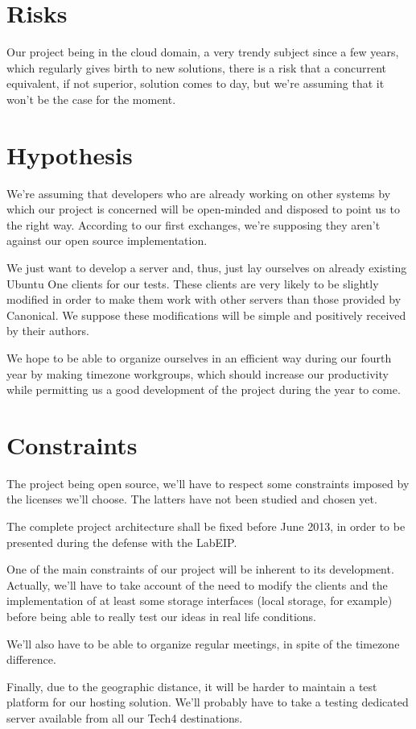 \section{Risks}

Our project being in the cloud domain, a very trendy subject since a few years, which regularly gives birth to new solutions, there is a risk that a concurrent equivalent, if not superior, solution comes to day, but we're assuming that it won't be the case for the moment.

\section{Hypothesis}

We're assuming that developers who are already working on other systems by which our project is concerned will be open-minded and disposed to point us to the right way. According to our first exchanges, we're supposing they aren't against our open source implementation.

We just want to develop a server and, thus, just lay ourselves on already existing Ubuntu One clients for our tests. These clients are very likely to be slightly modified in order to make them work with other servers than those provided by Canonical. We suppose these modifications will be simple and positively received by their authors.

We hope to be able to organize ourselves in an efficient way during our fourth year by making timezone workgroups, which should increase our productivity while permitting us a good development of the project during the year to come.

\section{Constraints}

The project being open source, we'll have to respect some constraints imposed by the licenses we'll choose. The latters have not been studied and chosen yet.

The complete project architecture shall be fixed before June 2013, in order to be presented during the defense with the LabEIP.

One of the main constraints of our project will be inherent to its development. Actually, we'll have to take account of the need to modify the clients and the implementation of at least some storage interfaces (local storage, for example) before being able to really test our ideas in real life conditions.

We'll also have to be able to organize regular meetings, in spite of the timezone difference.

Finally, due to the geographic distance, it will be harder to maintain a test platform for our hosting solution. We'll probably have to take a testing dedicated server available from all our Tech4 destinations.
